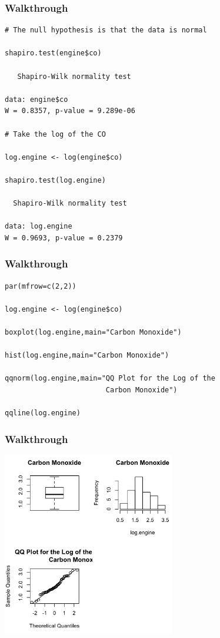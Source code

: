 \documentclass{beamer}
\begin{document}

\begin{frame}[fragile]
\frametitle{Walkthrough}
\footnotesize
\begin{verbatim}
# The null hypothesis is that the data is normal

shapiro.test(engine$co)

   Shapiro-Wilk normality test

data: engine$co
W = 0.8357, p-value = 9.289e-06

# Take the log of the CO

log.engine <- log(engine$co)

shapiro.test(log.engine)

  Shapiro-Wilk normality test
  
data: log.engine
W = 0.9693, p-value = 0.2379
\end{verbatim}
\end{frame}


\begin{frame}[fragile]
\frametitle{Walkthrough}
\small
\begin{verbatim}
par(mfrow=c(2,2))

log.engine <- log(engine$co)

boxplot(log.engine,main="Carbon Monoxide")

hist(log.engine,main="Carbon Monoxide")

qqnorm(log.engine,main="QQ Plot for the Log of the 
                        Carbon Monoxide")

qqline(log.engine)
\end{verbatim}
\end{frame}


\begin{frame}[fragile]
\frametitle{Walkthrough}
\begin{center}
\includegraphics[height=8cm]{../IMG/walk2.png}
\end{center}
\end{frame}
\end{document}
